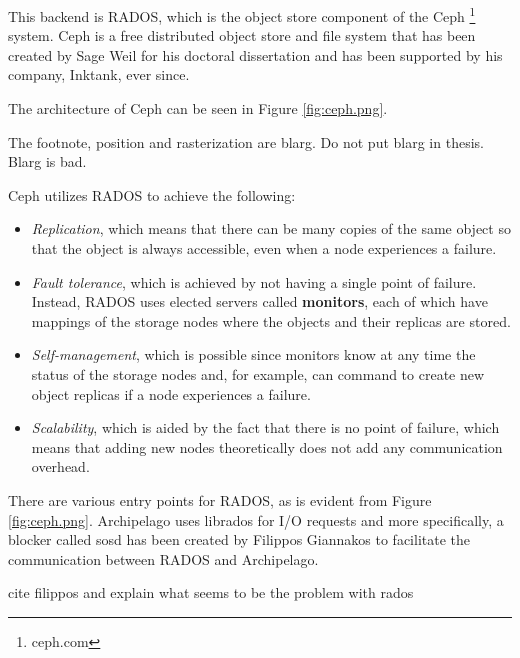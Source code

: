 This backend is RADOS\cite{rados}, which is the object store component of the 
Ceph \footnote{ceph.com} system. Ceph is a free distributed object store and 
file system that has been created by Sage Weil for his doctoral dissertation
\cite{weil-thesis} and has been supported by his company, Inktank, ever since.

The architecture of Ceph can be seen in Figure \ref{fig:ceph.png}.


\fixme The footnote, position and rasterization are blarg. Do not put blarg in 
thesis. Blarg is bad.

Ceph utilizes RADOS to achieve the following:

\begin{itemize}
	\item \textit{Replication}, which means that there can be many copies 
		of the same object so that the object is always accessible, 
		even when a node experiences a failure.
	\item \textit{Fault tolerance}, which is achieved by not having a 
		single point of failure. Instead, RADOS uses elected servers 
		called \textbf{monitors}, each of which have mappings of the 
		storage nodes where the objects and their replicas are stored.  
	\item \textit{Self-management}, which is possible since monitors know 
		at any time the status of the storage nodes and, for example, 
		can command to create new object replicas if a node experiences 
		a failure.
	\item \textit{Scalability}, which is aided by the fact that there is no 
		point of failure, which means that adding new nodes 
		theoretically does not add any communication overhead.
\end{itemize}

There are various entry points for RADOS, as is evident from Figure 
\ref{fig:ceph.png}. Archipelago uses librados for I/O requests and more 
specifically, a blocker called sosd\cite{sosd} has been created by Filippos 
Giannakos to facilitate the communication between RADOS and Archipelago.

\fixme cite filippos and explain what seems to be the problem with rados

